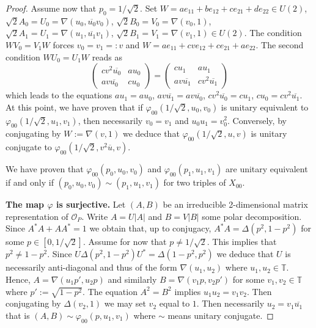 \documentclass[12pt, a4paper]{amsart}
\def\T{\mathbb{T}}
\newcommand{\CO}[0]{\mathcal{O}} \newcommand{\CP}[0]{\mathcal{P}}
\numberwithin{equation}{section}
\begin{document}
\begin{proof}
Assume now that $p_0=1/\sqrt{2}$. 
Set $W=ae_{11}+be_{12}+ce_{21}+de_{22}\in U(2)$, 
$\sqrt{2}A_0=U_0=\nabla(u_0, \overline{u_0}v_0)$,
$\sqrt{2}B_0=V_0=\nabla(v_0, 1)$,
$\sqrt{2}A_1=U_1=\nabla(u_1, \overline{u_1}v_1)$,
$\sqrt{2}B_1=V_1=\nabla(v_1, 1)\in U(2)$.
The condition $WV_0=V_1W$ forces
$v_0=v_1=:v$ and 
$W=ae_{11}+cve_{12}+ce_{21}+ae_{22}$.
The second condition $WU_0=U_1W$ reads as
$$
 \begin{pmatrix} 
cv^2\overline{u_0} & au_0\\
av\overline{u_0} & cu_0
\end{pmatrix}   =
 \begin{pmatrix} 
cu_1 & au_1 \\
av\overline{u_1} & cv^2\overline{u_1}
\end{pmatrix}  
$$
which leads to the equations
$au_1=au_0$, 
$av\overline{u_1}=av\overline{u_0}$, 
$cv^2\overline{u_0}=cu_1$, 
$cu_0=cv^2\overline{u_1}$. At this point, we have proven that if $\varphi_{00}(1/\sqrt 2, u_0,v_0)$ is unitary equivalent to $\varphi_{00}(1/\sqrt 2,u_1,v_1)$, then necessarily $v_0=v_1$ and $u_0u_1=v_0^2.$
Conversely, by conjugating by $W:=\nabla(v,1)$ we deduce that $\varphi_{00}(1/\sqrt 2, u,v)$ is unitary conjugate to $\varphi_{00}(1/\sqrt 2,v^2\overline u , v)$. 

We have proven that $\varphi_{00}(p_0,u_0,v_0)$ and $\varphi_{00}(p_1,u_1,v_1)$ are unitary equivalent if and only if $(p_0,u_0,v_0)\sim (p_1,u_1,v_1)$ for two triples of $X_{00}.$

\textbf{The map $\varphi$ is surjective.}
Let $(A,B)$ be an irreducible 2-dimensional matrix representation of $\CO_P.$
Write $A=U|A|$ and $B=V|B|$ some polar decomposition.
Since $A^*A+AA^*=1$ we obtain that, up to conjugacy, $A^*A=\Delta(p^2,1-p^2)$ for some $p\in [0,1/\sqrt 2].$
Assume for now that $p\neq 1/\sqrt 2$. This implies that $p^2\neq 1-p^2$.
Since $U\Delta(p^2,1-p^2)U^*=\Delta(1-p^2,p^2)$ we deduce that $U$ is necessarily anti-diagonal and thus of the form $\nabla(u_1,u_2)$ where $u_1,u_2\in\T.$
Hence, $A=\nabla(u_1p',u_2p)$ and similarly $B=\nabla(v_1p,v_2 p')$ for some $v_1,v_2\in\T$ where $p':=\sqrt{1-p^2}.$
The equation $A^2=B^2$ implies $u_1u_2=v_1v_2.$
Then conjugating by $\Delta(v_2,1)$ we may set $v_2$ equal to $1.$
Then necessarily $u_2=v_1\overline{u_1}$ that is $(A,B)\sim\varphi_{00}(p,u_1,v_1)$ where $\sim$ means unitary conjugate.


\end{proof}
\end{document}
